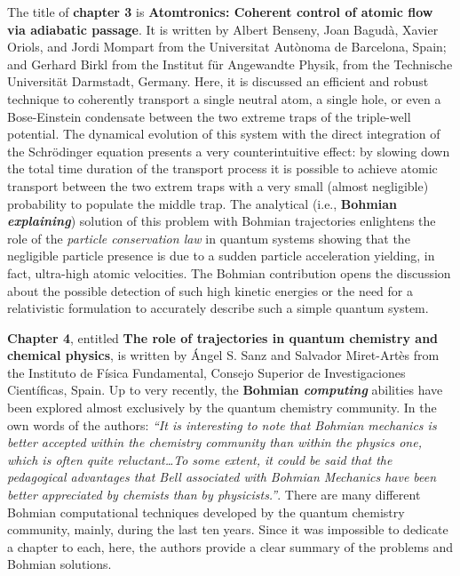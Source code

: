 \documentclass[onecolumn,nofootinbib, secnumarabic, amsmath, nobibnotes,12pt,aps,pra]{revtex4-1}
\begin{document}
The title of \textbf{chapter 3} is \textbf{Atomtronics: Coherent control of atomic flow via adiabatic passage}. It is written by Albert Benseny, Joan Bagud\`{a}, Xavier Oriols, and Jordi Mompart from the Universitat Aut\`{o}noma de Barcelona, Spain; and Gerhard Birkl from the Institut f\"ur Angewandte Physik, from the Technische Universit\"at Darmstadt, Germany. Here, it is discussed an efficient and robust technique to coherently transport a single neutral atom, a single hole, or even a Bose-Einstein condensate between the two extreme traps of the triple-well potential. The dynamical evolution of this system with the direct integration of the Schr\"odinger equation presents a very counterintuitive effect: by slowing down the total time duration of the transport process it is possible to achieve atomic transport between the two extrem traps with a very small (almost negligible) probability to populate the middle trap. The analytical (i.e., \textbf{Bohmian \emph{explaining}}) solution of this problem with Bohmian trajectories enlightens the role of the \emph{particle conservation law} in quantum systems showing that the negligible particle presence is due to a sudden particle acceleration yielding, in fact, ultra-high atomic velocities. The Bohmian contribution opens the discussion about the possible detection of such high kinetic energies or the need for a relativistic formulation to accurately describe such a simple quantum system.

\textbf{Chapter 4}, entitled \textbf{The role of trajectories in quantum chemistry and chemical physics}, is written by \'{A}ngel S. Sanz and Salvador Miret-Art\`es from the Instituto de F\'isica Fundamental, Consejo Superior de Investigaciones Cient\'ificas, Spain. Up to very recently, the \textbf{Bohmian \emph{computing}} abilities have been explored almost exclusively by the quantum chemistry community. In the own words of the authors: \emph{``It is interesting to note that Bohmian mechanics is better accepted within the chemistry community than within the physics one, which is often quite reluctant\ldots To some extent, it could be said that the pedagogical advantages that Bell associated with Bohmian Mechanics have been better appreciated by chemists than by physicists.''}. There are many different Bohmian computational techniques developed by the quantum chemistry community, mainly, during the last ten years. Since it was impossible to dedicate a chapter to each, here, the authors provide a clear summary of the problems and Bohmian solutions.
\end{document}
